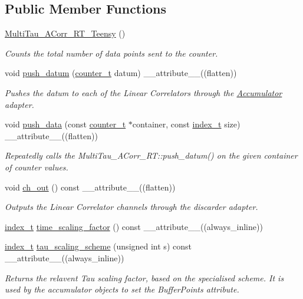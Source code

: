 \subsection*{Public Member Functions}
\begin{DoxyCompactItemize}
\item 
\hyperlink{classMultiTau__ACorr__RT__Teensy_a28cfdcd7468aac93693a4d4803fc95f9}{Multi\+Tau\+\_\+\+A\+Corr\+\_\+\+R\+T\+\_\+\+Teensy} ()
\begin{DoxyCompactList}\small\item\em Counts the total number of data points sent to the counter. \end{DoxyCompactList}\item 
void \hyperlink{classMultiTau__ACorr__RT__Teensy_a1ad6126310c987f53a0ec7ab3ae03a12}{push\+\_\+datum} (\hyperlink{types_8hpp_a22f279793847eba127de149437848c48}{counter\+\_\+t} datum) \+\_\+\+\_\+attribute\+\_\+\+\_\+((flatten))
\begin{DoxyCompactList}\small\item\em Pushes the datum to each of the Linear Correlators through the \hyperlink{classAccumulator}{Accumulator} adapter. \end{DoxyCompactList}\item 
void \hyperlink{classMultiTau__ACorr__RT__Teensy_ae36ab4fb6f646d068e638ab7e4ec9da8}{push\+\_\+data} (const \hyperlink{types_8hpp_a22f279793847eba127de149437848c48}{counter\+\_\+t} $\ast$container, const \hyperlink{types_8hpp_a7c40bb931c31595ed6308605f4537447}{index\+\_\+t} size) \+\_\+\+\_\+attribute\+\_\+\+\_\+((flatten))
\begin{DoxyCompactList}\small\item\em Repeatedly calls the Multi\+Tau\+\_\+\+A\+Corr\+\_\+\+R\+T\+::push\+\_\+datum() on the given container of counter values. \end{DoxyCompactList}\item 
void \hyperlink{classMultiTau__ACorr__RT__Teensy_a37a29725971f15305398ac7c9c360eac}{ch\+\_\+out} () const \+\_\+\+\_\+attribute\+\_\+\+\_\+((flatten))
\begin{DoxyCompactList}\small\item\em Outputs the Linear Correlator channels through the discarder adapter. \end{DoxyCompactList}\item 
\hyperlink{types_8hpp_a7c40bb931c31595ed6308605f4537447}{index\+\_\+t} \hyperlink{classMultiTau__ACorr__RT__Teensy_a218fdc2fcc3bb7cd5d1c2f03ea2506da}{time\+\_\+scaling\+\_\+factor} () const \+\_\+\+\_\+attribute\+\_\+\+\_\+((always\+\_\+inline))
\item 
\hyperlink{types_8hpp_a7c40bb931c31595ed6308605f4537447}{index\+\_\+t} \hyperlink{classMultiTau__ACorr__RT__Teensy_af90bc219b8b9dc316c56efd7c74aae6f}{tau\+\_\+scaling\+\_\+scheme} (unsigned int s) const \+\_\+\+\_\+attribute\+\_\+\+\_\+((always\+\_\+inline))
\begin{DoxyCompactList}\small\item\em Returns the relavent Tau scaling factor, based on the specialised scheme. It is used by the accumulator objects to set the Buffer\+Points attribute. \end{DoxyCompactList}\end{DoxyCompactItemize}
